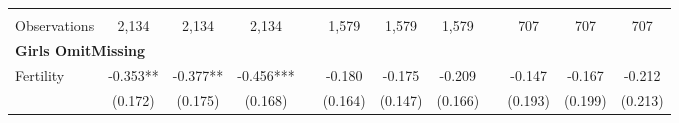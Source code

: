 \begin{landscape}
\begin{table}[htpb!]
\begin{center}
\begin{tabular}{lcccp{2mm}cccp{2mm}ccc}
\begin{footnotesize}\end{footnotesize}&\begin{footnotesize}\end{footnotesize}&\begin{footnotesize}\end{footnotesize}&\begin{footnotesize}\end{footnotesize}&\begin{footnotesize}\end{footnotesize}&\begin{footnotesize}\end{footnotesize}&\begin{footnotesize}\end{footnotesize}&\begin{footnotesize}\end{footnotesize}&\begin{footnotesize}\end{footnotesize}&\begin{footnotesize}\end{footnotesize}&\begin{footnotesize}\end{footnotesize}&\begin{footnotesize}\end{footnotesize}\\Observations&2,134&2,134&2,134&&1,579&1,579&1,579&&707&707&707\\
\multicolumn{12}{l}{\textbf{Girls OmitMissing}}\\ 
Fertility&-0.353**&-0.377**&-0.456***&&-0.180&-0.175&-0.209&&-0.147&-0.167&-0.212\\
&(0.172)&(0.175)&(0.168)&&(0.164)&(0.147)&(0.166)&&(0.193)&(0.199)&(0.213)\\

\end{tabular}
\end{center}
\end{table}
\end{landscape}
